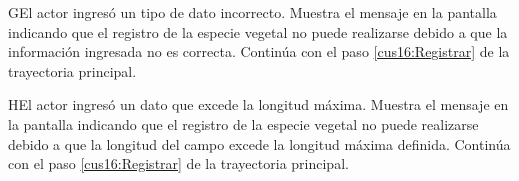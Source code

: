     \begin{UCtrayectoriaA}{G}{El actor ingresó un tipo de dato incorrecto.}    
    \UCpaso[\UCsist] Muestra el mensaje  en la pantalla  indicando que el registro de la especie vegetal no puede realizarse debido a que la información ingresada no es correcta.
    \UCpaso[] Continúa con el paso \ref{cus16:Registrar} de la trayectoria principal.     
    \end{UCtrayectoriaA}
    
    \begin{UCtrayectoriaA}{H}{El actor ingresó un dato que excede la longitud máxima.}    
    \UCpaso[\UCsist] Muestra el mensaje  en la pantalla  indicando que el registro de la especie vegetal no puede realizarse debido a que la longitud del campo excede la longitud máxima definida.
    \UCpaso[] Continúa con el paso \ref{cus16:Registrar} de la trayectoria principal.     
    \end{UCtrayectoriaA}
